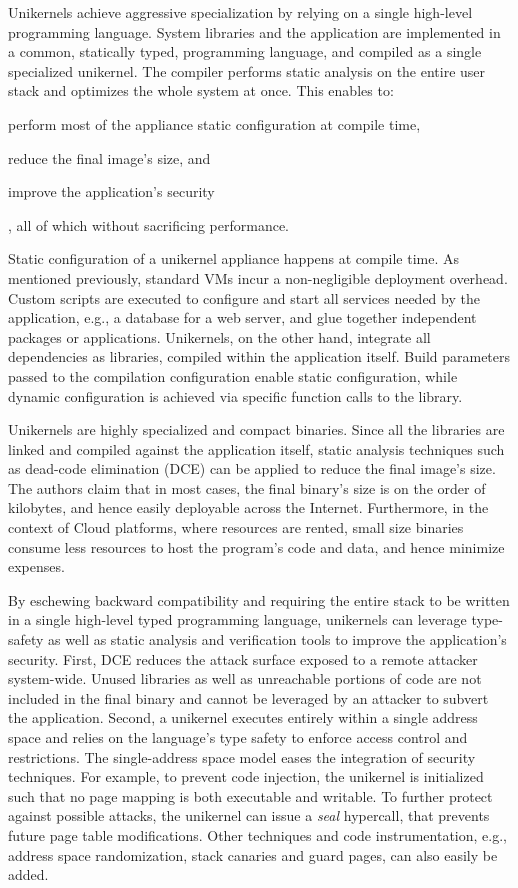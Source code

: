 Unikernels achieve aggressive specialization by relying on a single high-level programming language.
System libraries and the application are implemented in a common, statically typed, programming language, and compiled as a single specialized unikernel.
The compiler performs static analysis on the entire user stack and optimizes the whole system at once.
This enables to:
\begin{enumerate*}
	\item perform most of the appliance static configuration at compile time,
	\item reduce the final image's size, and
	\item improve the application's security
\end{enumerate*}, all of which without sacrificing performance.

Static configuration of a unikernel appliance happens at compile time.
As mentioned previously, standard VMs incur a non-negligible deployment overhead.
Custom scripts are executed to configure and start all services needed by the application, e.g., a database for a web server, and glue together independent packages or applications.
Unikernels, on the other hand, integrate all dependencies as libraries, compiled within the application itself.
Build parameters passed to the compilation configuration enable static configuration, while dynamic configuration is achieved via specific function calls to the library.

Unikernels are highly specialized and compact binaries.
Since all the libraries are linked and compiled against the application itself, static analysis techniques such as dead-code elimination (DCE) can be applied to reduce the final image's size.
The authors claim that in most cases, the final binary's size is on the order of kilobytes, and hence easily deployable across the Internet.
Furthermore, in the context of Cloud platforms, where resources are rented, small size binaries consume less resources to host the program's code and data, and hence minimize expenses.

By eschewing backward compatibility and requiring the entire stack to be written in a single high-level typed programming language, unikernels can leverage type-safety as well as static analysis and verification tools to improve the application's security.
First, DCE reduces the attack surface exposed to a remote attacker system-wide.
Unused libraries as well as unreachable portions of code are not included in the final binary and cannot be leveraged by an attacker to subvert the application.
Second, a unikernel executes entirely within a single address space and relies on the language's type safety to enforce access control and restrictions.
The single-address space model eases the integration of security techniques. 
For example, to prevent code injection, the unikernel is initialized such that no page mapping is both executable and writable.
To further protect against possible attacks, the unikernel can issue a \emph{seal} hypercall, that prevents future page table modifications.
Other techniques and code instrumentation, e.g., address space randomization, stack canaries and guard pages, can also easily be added.


